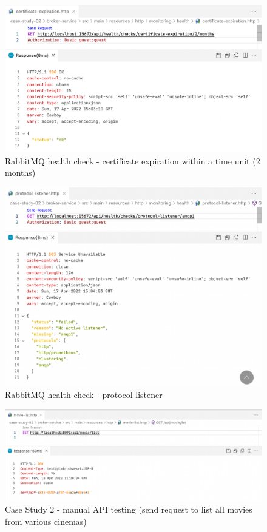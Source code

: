 \begin{figure}[H]
  \centering
  \includegraphics[width=1.0\linewidth]{./assets/images/case-studies/cs02-hc3.png}
  \caption{RabbitMQ health check - certificate expiration within a time unit (2 months)}
  \label{fig:cs02-hc3}
\end{figure}

\begin{figure}[H]
  \centering
  \includegraphics[width=1.0\linewidth]{./assets/images/case-studies/cs02-hc5.png}
  \caption{RabbitMQ health check - protocol listener}
  \label{fig:cs02-hc5}
\end{figure}


\begin{figure}[H]
  \centering
  \includegraphics[width=1.0\linewidth]{./assets/images/case-studies/cs02-manual-1.png}
  \caption{Case Study 2 - manual API testing (send request to list all movies from various cinemas)}
  \label{fig:cs02-manual-1}
\end{figure}

